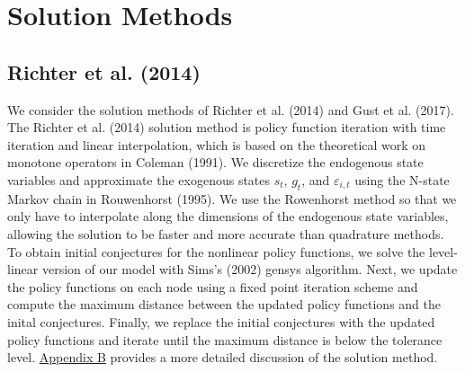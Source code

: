 \documentclass[12pt, final]{article}
\begin{document}
\section{Solution Methods}
\subsection{Richter et al. (2014)}
We consider the solution methods of Richter et al. (2014) and Gust et al. (2017). The Richter et al. (2014) solution method is policy function iteration with time iteration and linear interpolation, which is based on the theoretical work on monotone operators in Coleman (1991). We discretize the endogenous state variables and approximate the exogenous states $s_t$, $g_t$, and $\varepsilon_{i,t}$ using the N-state Markov chain in Rouwenhorst (1995). We use the Rowenhorst method so that we only have to interpolate along the dimensions of the endogenous state variables, allowing the solution to be faster and more accurate than quadrature methods. To obtain initial conjectures for the nonlinear policy functions, we solve the level-linear version of our model with Sims's (2002) gensys algorithm. Next, we update the policy functions on each node using a fixed point iteration scheme and compute the maximum distance between the updated policy functions and the inital conjectures. Finally, we replace the initial conjectures with the updated policy functions and iterate until the maximum distance is below the tolerance level. \hyperlink{Appendix B}{Appendix B} provides a more detailed discussion of the solution method. %
\end{document}
